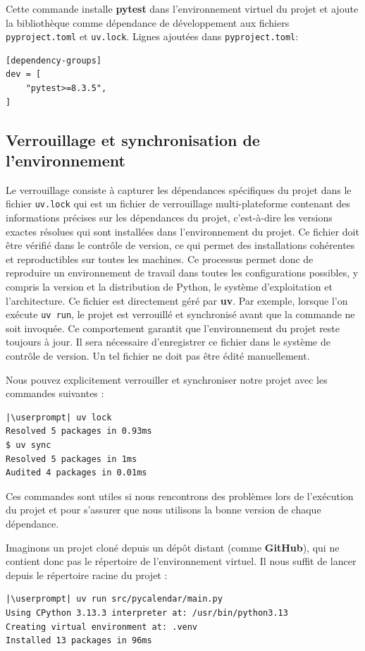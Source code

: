 Cette commande installe \textbf{pytest} dans l'environnement virtuel du projet et ajoute la bibliothèque comme dépendance de développement aux fichiers \texttt{pyproject.toml} et \texttt{uv.lock}. Lignes ajoutées dans \texttt{pyproject.toml}:
\begin{lstlisting}[style=file]
[dependency-groups]
dev = [
    "pytest>=8.3.5",
]
\end{lstlisting}

\subsection*{Verrouillage et synchronisation de l'environnement}
Le verrouillage consiste à capturer les dépendances spécifiques du projet dans le fichier \texttt{uv.lock} qui est un fichier de verrouillage multi-plateforme contenant des informations précises sur les dépendances du projet, c'est-à-dire les versions exactes résolues qui sont installées dans l'environnement du projet. Ce fichier doit être vérifié dans le contrôle de version, ce qui permet des installations cohérentes et reproductibles sur toutes les machines. Ce processus permet donc de reproduire un environnement de travail dans toutes les configurations possibles, y compris la version et la distribution de Python, le système d'exploitation et l'architecture. Ce fichier est directement géré par \textbf{uv}. Par exemple, lorsque l'on exécute \texttt{uv run}, le projet est verrouillé et synchronisé avant que la commande ne soit invoquée. Ce comportement garantit que l'environnement du projet reste toujours à jour. Il sera nécessaire d'enregistrer ce fichier dans le système de contrôle de version. Un tel fichier ne doit pas être édité manuellement.

Nous pouvez explicitement verrouiller et synchroniser notre projet avec les commandes suivantes :
\begin{lstlisting}[style=bash]
|\userprompt| uv lock
Resolved 5 packages in 0.93ms
$ uv sync
Resolved 5 packages in 1ms
Audited 4 packages in 0.01ms
\end{lstlisting}

Ces commandes sont utiles si nous rencontrons des problèmes lors de l'exécution du projet et pour s'assurer que nous utilisons la bonne version de chaque dépendance.

Imaginons un projet cloné depuis un dépôt distant (comme \textbf{GitHub}), qui ne contient donc pas le répertoire de l'environnement virtuel. Il nous suffit de lancer depuis le répertoire racine du projet :
\begin{lstlisting}[style=bash]
|\userprompt| uv run src/pycalendar/main.py
Using CPython 3.13.3 interpreter at: /usr/bin/python3.13
Creating virtual environment at: .venv
Installed 13 packages in 96ms
\end{lstlisting}

